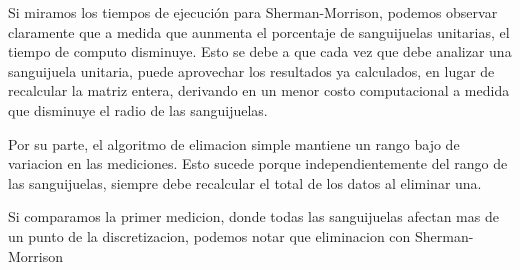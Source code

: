Si miramos los tiempos de ejecución para Sherman-Morrison, podemos observar claramente que a medida que aunmenta el porcentaje de sanguijuelas unitarias, el tiempo de computo disminuye. Esto se debe a que cada vez que debe analizar una sanguijuela unitaria, puede aprovechar los resultados ya calculados, en lugar de recalcular la matriz entera, derivando en un menor costo computacional a medida que disminuye el radio de las sanguijuelas.

Por su parte, el algoritmo de elimacion simple mantiene un rango bajo de variacion en las mediciones. Esto sucede porque independientemente del rango de las sanguijuelas, siempre debe recalcular el total de los datos al eliminar una. 

Si comparamos la primer medicion, donde todas las sanguijuelas afectan mas de un punto de la discretizacion, podemos notar que eliminacion con Sherman-Morrison

